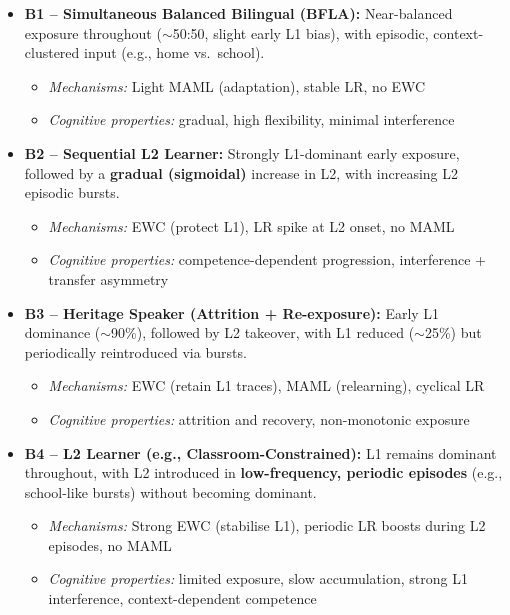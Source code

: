 \begin{itemize}
    \item \textbf{B1 – Simultaneous Balanced Bilingual (BFLA):} Near-balanced exposure throughout ($\sim$50:50, slight early L1 bias), with episodic, context-clustered input (e.g., home vs.\ school).
    \begin{itemize}
        \item \textit{Mechanisms:} Light MAML (adaptation), stable LR, no EWC
        \item \textit{Cognitive properties:} gradual, high flexibility, minimal interference
    \end{itemize}

    \item \textbf{B2 – Sequential L2 Learner:} Strongly L1-dominant early exposure, followed by a \textbf{gradual (sigmoidal)} increase in L2, with increasing L2 episodic bursts.
    \begin{itemize}
        \item \textit{Mechanisms:} EWC (protect L1), LR spike at L2 onset, no MAML
        \item \textit{Cognitive properties:} competence-dependent progression, interference + transfer asymmetry
    \end{itemize}

    \item \textbf{B3 – Heritage Speaker (Attrition + Re-exposure):} Early L1 dominance ($\sim$90\%), followed by L2 takeover, with L1 reduced ($\sim$25\%) but periodically reintroduced via bursts.
    \begin{itemize}
        \item \textit{Mechanisms:} EWC (retain L1 traces), MAML (relearning), cyclical LR
        \item \textit{Cognitive properties:} attrition and recovery, non-monotonic exposure
    \end{itemize}

    \item \textbf{B4 – L2 Learner (e.g., Classroom-Constrained):} L1 remains dominant throughout, with L2 introduced in \textbf{low-frequency, periodic episodes} (e.g., school-like bursts) without becoming dominant.
    \begin{itemize}
        \item \textit{Mechanisms:} Strong EWC (stabilise L1), periodic LR boosts during L2 episodes, no MAML
        \item \textit{Cognitive properties:} limited exposure, slow accumulation, strong L1 interference, context-dependent competence
    \end{itemize}


\end{itemize}
